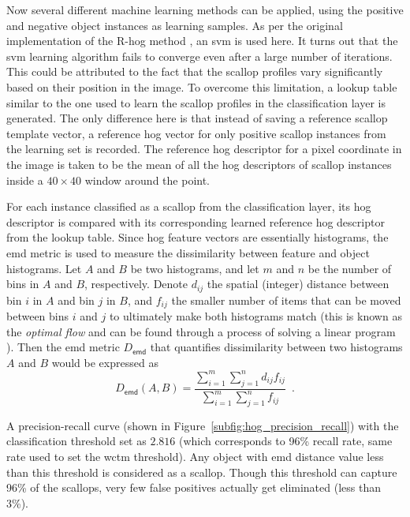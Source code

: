 \documentclass {udthesis}
\begin{document}
Now several different machine learning methods can be applied, using the positive and negative object instances as learning samples. 
As per the original implementation of the \textsc{R-}\gls{hog} method \cite{dalal}, an \gls{svm} is used here. 
It turns out that the \gls{svm} learning algorithm fails to converge even after a large number of iterations. 
This could be attributed to the fact that the scallop profiles  vary significantly based on their position in the image. 
To overcome this limitation, a lookup table similar to the one used to learn the scallop profiles in the classification layer is generated. 
The only difference here is that instead of saving a reference scallop template vector, a reference \gls{hog} vector for only positive scallop instances from the learning set is recorded. 
The reference \gls{hog} descriptor for a pixel coordinate in the image is taken to be the mean of all the \gls{hog} descriptors of scallop instances inside a $40\times40$ window around the point.

For each instance classified as a scallop from the classification layer, its \gls{hog} descriptor is compared with its corresponding learned reference \gls{hog} descriptor from the lookup table.
Since \gls{hog} feature vectors are essentially histograms, the \gls{emd} metric \cite{rubner} is used to measure the dissimilarity between feature and object histograms.
Let $A$ and $B$ be two histograms, and let $m$ and $n$ be the number of bins in $A$ and $B$, respectively.
Denote $d_{ij}$ the spatial (integer) distance between bin $i$ in $A$ and bin $j$ in $B$, and $f_{ij}$ the smaller number of items that can be moved between bins $i$ and $j$ to ultimately make both histograms match (this is known as the \emph{optimal flow} and can be found through a process of solving a linear program \cite{rubner}).
Then the \gls{emd} metric $D_\mathsf{emd}$ that quantifies dissimilarity between two histograms $A$ and $B$ would be expressed as
%
\[
 D_\mathsf{emd}(A,B)=\frac{\sum_{i=1}^m\sum_{j=1}^nd_{ij}f_{ij}}{\sum_{i=1}^m\sum_{j=1}^nf_{ij}} \enspace.
\]


A precision-recall curve (shown in Figure~\ref{subfig:hog_precision_recall}) with the classification threshold set as $2.816$ (which corresponds to 96\% recall rate, same rate used to set the \gls{wctm} threshold). 
Any object with \gls{emd} distance value less than this threshold is considered as a scallop.
 Though this threshold can capture 96\% of the scallops, very few false positives actually get eliminated (less than 3\%).
\end{document}
